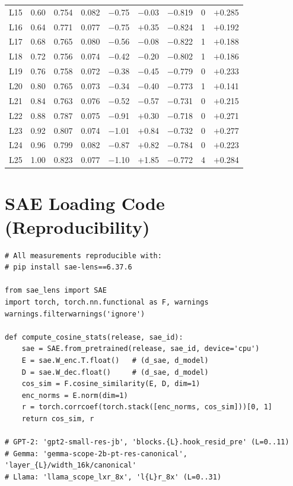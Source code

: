 \documentclass[11pt,a4paper]{article}
\begin{document}
\begin{longtable}{@{}crrrrrrrr@{}}
L15 & 0.60 & 0.754 & 0.082 & $-$0.75 & $-$0.03 & $-$0.819 & 0 & $+$0.285 \\
L16 & 0.64 & 0.771 & 0.077 & $-$0.75 & $+$0.35 & $-$0.824 & 1 & $+$0.192 \\
L17 & 0.68 & 0.765 & 0.080 & $-$0.56 & $-$0.08 & $-$0.822 & 1 & $+$0.188 \\
L18 & 0.72 & 0.756 & 0.074 & $-$0.42 & $-$0.20 & $-$0.802 & 1 & $+$0.186 \\
L19 & 0.76 & 0.758 & 0.072 & $-$0.38 & $-$0.45 & $-$0.779 & 0 & $+$0.233 \\
L20 & 0.80 & 0.765 & 0.073 & $-$0.34 & $-$0.40 & $-$0.773 & 1 & $+$0.141 \\
L21 & 0.84 & 0.763 & 0.076 & $-$0.52 & $-$0.57 & $-$0.731 & 0 & $+$0.215 \\
L22 & 0.88 & 0.787 & 0.075 & $-$0.91 & $+$0.30 & $-$0.718 & 0 & $+$0.271 \\
L23 & 0.92 & 0.807 & 0.074 & $-$1.01 & $+$0.84 & $-$0.732 & 0 & $+$0.277 \\
L24 & 0.96 & 0.799 & 0.082 & $-$0.87 & $+$0.82 & $-$0.784 & 0 & $+$0.223 \\
L25 & 1.00 & 0.823 & 0.077 & $-$1.10 & $+$1.85 & $-$0.772 & 4 & $+$0.284 \\
\end{longtable}

\section{SAE Loading Code (Reproducibility)}
\label{app:code}

\begin{verbatim}
# All measurements reproducible with:
# pip install sae-lens==6.37.6

from sae_lens import SAE
import torch, torch.nn.functional as F, warnings
warnings.filterwarnings('ignore')

def compute_cosine_stats(release, sae_id):
    sae = SAE.from_pretrained(release, sae_id, device='cpu')
    E = sae.W_enc.T.float()   # (d_sae, d_model)
    D = sae.W_dec.float()     # (d_sae, d_model)
    cos_sim = F.cosine_similarity(E, D, dim=1)
    enc_norms = E.norm(dim=1)
    r = torch.corrcoef(torch.stack([enc_norms, cos_sim]))[0, 1]
    return cos_sim, r

# GPT-2: 'gpt2-small-res-jb', 'blocks.{L}.hook_resid_pre' (L=0..11)
# Gemma: 'gemma-scope-2b-pt-res-canonical', 'layer_{L}/width_16k/canonical'
# Llama: 'llama_scope_lxr_8x', 'l{L}r_8x' (L=0..31)
\end{verbatim}
\end{document}
